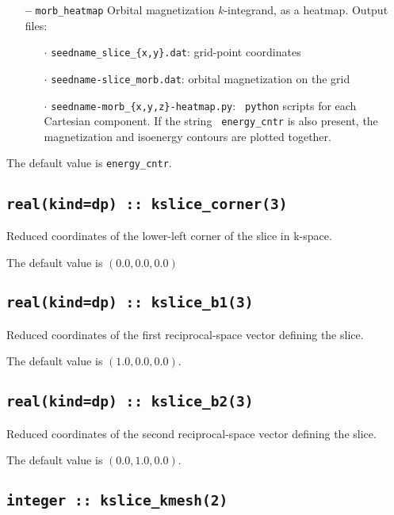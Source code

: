 \begin{itemize}
\item[{\bf --}] \verb#morb_heatmap# Orbital magnetization
  $k$-integrand, as a heatmap. Output files:

  \begin{itemize}

  \item[$\cdot$] {\tt seedname\_slice\_\{x,y\}.dat}: grid-point
    coordinates
    
  \item[$\cdot$] {\tt seedname-slice\_morb.dat}: orbital magnetization
    on the grid
    
  \item[$\cdot$] {\tt seedname-morb\_\{x,y,z\}-heatmap.py}: {\tt
      python} scripts for each Cartesian component. If the string {\tt
      energy\_cntr} is also present, the magnetization and isoenergy
    contours are plotted together.
    
  \end{itemize}

\end{itemize}

The default value is {\tt energy\_cntr}.

\subsection[kslice\_corner]{\tt real(kind=dp) :: kslice\_corner(3)}
Reduced coordinates of the lower-left corner of the slice in k-space.

The default value is $(0.0,0.0,0.0)$

\subsection[kslice\_corner]{\tt real(kind=dp) :: kslice\_b1(3)}
Reduced coordinates of the first reciprocal-space vector 
defining the slice.

The default value is $(1.0,0.0,0.0)$.

\subsection[kslice\_corner]{\tt real(kind=dp) :: kslice\_b2(3)}
Reduced coordinates of the second reciprocal-space vector 
defining the slice.

The default value is $(0.0,1.0,0.0)$.

\subsection[kslice\_num\_points]{\tt integer :: kslice\_kmesh(2)}

